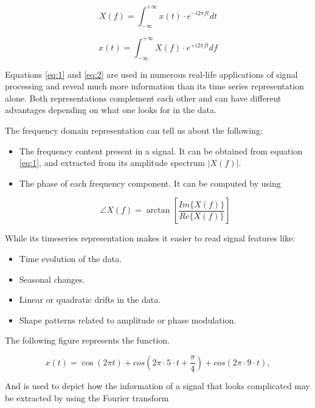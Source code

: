 \begin{equation}
\label{eq:1}
X(f) = \int_{-\infty}^{+\infty} x(t)\cdot e^{-i2\pi f t} dt
\end{equation}

\begin{equation}
\label{eq:2}
x(t) = \int_{-\infty}^{+\infty} X(f)\cdot e^{+i2\pi f t} df
\end{equation}

Equations \ref{eq:1} and \ref{eq:2} are used in numerous real-life applications of signal processing and reveal much more information than its time series representation alone. Both representations complement each other and can have different advantages depending on what one looks for in the data. 

The frequency domain representation can tell us about the following:

\begin{itemize}
\item 
The frequency content present in a signal. It can be obtained from equation \ref{eq:1}, and extracted from its amplitude spectrum $|X(f)|$.
\item 
The phase of each frequency component. It can be computed by using

\begin{equation}
\angle X(f) = \arctan\left[\frac{Im\{X(f)\}}{Re\{X(f)\}}\right]
\end{equation}

\end{itemize}

While its timeseries representation makes it easier to read signal features like:

\begin{itemize}
\item Time evolution of the data.
\item Seasonal changes.
\item Linear or quadratic drifts in the data.
\item Shape patterns related to amplitude or phase modulation.

\end{itemize}

The following figure represents the function. 

\begin{equation}\label{tS}
x(t) = \cos(2\pi t) + cos(2\pi\cdot 5\cdot t + \frac{\pi}{4}) + cos(2\pi\cdot 9\cdot t),
\end{equation}

And is used to depict how the information of a signal that looks complicated may be extracted by using the Fourier transform

